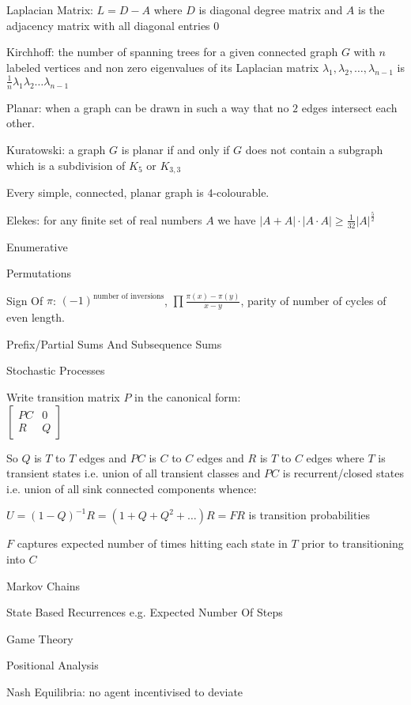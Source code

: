 Laplacian Matrix: $L=D-A$ where $D$ is diagonal degree matrix and $A$ is the adjacency matrix with all diagonal entries $0$

Kirchhoff: the number of spanning trees for a given connected graph $G$ with $n$ labeled vertices and non zero eigenvalues of its Laplacian matrix $\lambda_1, \lambda_2, \dots, \lambda_{n-1}$ is $\frac{1}{n} \lambda_1 \lambda_2 \dots \lambda_{n-1}$

Planar: when a graph can be drawn in such a way that no $2$ edges intersect each other.

Kuratowski: a graph $G$ is planar if and only if $G$ does not contain a subgraph which is a subdivision of $K_5$ or $K_{3,3}$

Every simple, connected, planar graph is $4$-colourable.

Elekes: for any finite set of real numbers $A$ we have $|A+A| \cdot |A \cdot A| \ge \frac{1}{32} |A|^{\frac{5}{2}}$

Enumerative

Permutations

Sign Of $\pi$: $(-1)^{\text{number of inversions}}$, $\prod \frac{\pi(x)-\pi(y)}{x-y}$, parity of number of cycles of even length.

Prefix/Partial Sums And Subsequence Sums

Stochastic Processes

Write transition matrix $P$ in the canonical form: \\
$\begin{bmatrix}
PC & 0 \\
R & Q
\end{bmatrix}$

So $Q$ is $T$ to $T$ edges and $PC$ is $C$ to $C$ edges and $R$ is $T$ to $C$ edges where $T$ is transient states i.e. union of all transient classes and $PC$ is recurrent/closed states i.e. union of all sink connected components whence:

$U=(1-Q)^{-1}R=(1+Q+Q^2+\dots)R=FR$ is transition probabilities

$F$ captures expected number of times hitting each state in $T$ prior to transitioning into $C$

Markov Chains

State Based Recurrences e.g. Expected Number Of Steps

Game Theory

Positional Analysis

Nash Equilibria: no agent incentivised to deviate

